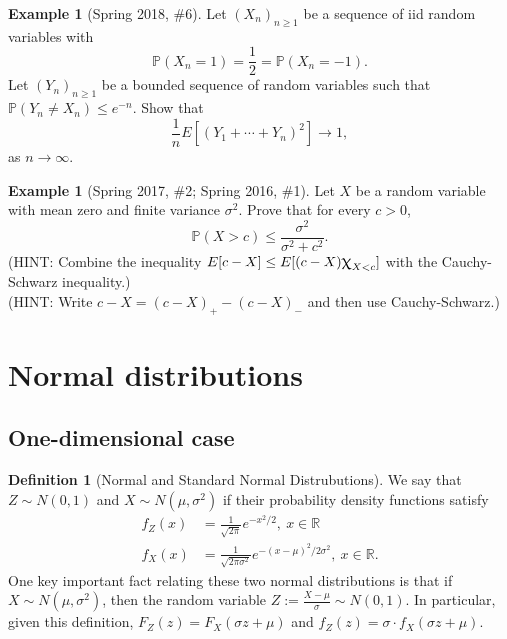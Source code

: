 \documentclass[12pt,reqno]{article}
\theoremstyle{plain}
\theoremstyle{definition}
\newtheorem{definition}[theorem]{Definition}
\newtheorem{example}[theorem]{Example}
\newcommand{\PP}[1]{\ensuremath{\mathbb{P}\left(#1\right)}}
\renewcommand{\chi}{\scalebox{1.25}{$\upchi$}}
\begin{document}
\begin{example}[Spring 2018, \#6]
Let $(X_n)_{n \geq 1}$ be a sequence of iid random variables with 
\[
\PP{X_n = 1} = \frac{1}{2} = \PP{X_n = -1}. 
\]
Let $(Y_n)_{n \geq 1}$ be a bounded sequence of random variables such that 
$\PP{Y_n \neq X_n} \leq e^{-n}$. Show that 
\[
\frac{1}{n} E[(Y_1+\cdots+Y_n)^2] \longrightarrow 1, 
\]
as $n \rightarrow \infty$. 
\end{example} 

\begin{example}[Spring 2017, \#2; Spring 2016, \#1]
Let $X$ be a random variable with mean zero and finite variance $\sigma^2$. 
Prove that for every $c > 0$, 
\[
\PP{X > c} \leq \frac{\sigma^2}{\sigma^2+c^2}. 
\]
(HINT: Combine the inequality $E[c-X] \leq E[(c-X)\chi_{X < c}]$ with the 
Cauchy-Schwarz inequality.) \\ 
(HINT: Write $c-X = (c-X)_{+} - (c-X)_{-}$ and then use Cauchy-Schwarz.) 
\end{example} 

\newpage 
\section{Normal distributions} 
\label{Section_NormalRVs} 

\subsection{One-dimensional case}

\begin{definition}[Normal and Standard Normal Distrubutions]
We say that $Z \sim N(0, 1)$ and $X \sim N(\mu, \sigma^2)$ if their 
probability density functions satisfy
\begin{align*} 
f_{Z}(x) & = \frac{1}{\sqrt{2\pi}} e^{-x^2/2},\ x \in \mathbb{R} \\ 
f_{X}(x) & = \frac{1}{\sqrt{2\pi\sigma^2}} e^{-(x-\mu)^2 / 2\sigma^2},\ 
     x \in \mathbb{R}. 
\end{align*} 
One key important fact relating these two normal distributions is that if 
$X \sim N(\mu,\sigma^2)$, then the random variable 
$Z := \frac{X-\mu}{\sigma} \sim N(0, 1)$. In particular, 
given this definition, $F_Z(z) = F_X(\sigma z+\mu)$ and 
$f_Z(z) = \sigma \cdot f_X(\sigma z+\mu)$. 
\end{definition} 
\end{document}
